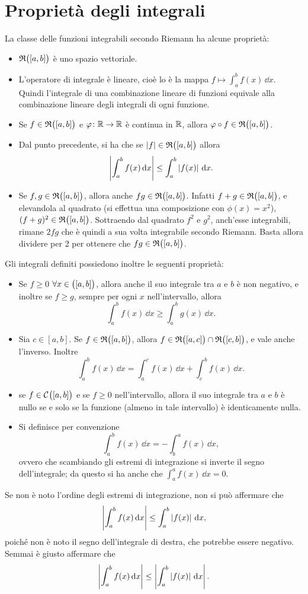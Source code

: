 \section{Proprietà degli integrali}
La classe delle funzioni integrabili secondo Riemann ha alcune proprietà:
\begin{itemize}
\item $\mathfrak{R}\big([a,b]\big)$ è uno spazio vettoriale.
\item L'operatore di integrale è lineare, cioè lo è la mappa $f\mapsto\int_a^bf(x)\,\dd x$. Quindi l'integrale di una combinazione lineare di funzioni equivale alla combinazione lineare degli integrali di ogni funzione.
\item Se $f\in\mathfrak{R}\big([a,b]\big)$ e $\varphi\colon\mathbb{R}\to\mathbb{R}$ è continua in $\mathbb{R}$, allora $\varphi\circ f\in\mathfrak{R}\big([a,b]\big)$.
\item Dal punto precedente, si ha che se $\left|{f}\right|\in\mathfrak{R}\big([a,b]\big)$ allora
\[
\left|{\int_a^bf(x)\,\textup{d} x}\right|\leq\int_a^b\left|{f(x)}\right|\,\textup{d} x.
\]
\item Se $f,g\in\mathfrak{R}\big([a,b]\big)$, allora anche $fg\in\mathfrak{R}\big([a,b]\big)$. Infatti $f+g\in\mathfrak{R}\big([a,b]\big)$, e elevandola al quadrato (si effettua una composizione con $\phi(x)=x^2$), $(f+g)^2\in\mathfrak{R}\big([a,b]\big)$. Sottraendo dal quadrato $f^2$ e $g^2$, anch'esse integrabili, rimane $2fg$ che è quindi a sua volta integrabile secondo Riemann. Basta allora dividere per 2 per ottenere che $fg\in\mathfrak{R}\big([a,b]\big)$.
\end{itemize}
Gli integrali definiti possiedono inoltre le seguenti proprietà:
\begin{itemize}
\item Se $f\geq0$ $\forall x\in\big([a,b]\big)$, allora anche il suo integrale tra $a$ e $b$ è non negativo, e inoltre se $f\geq g$, sempre per ogni $x$ nell'intervallo, allora
\[
\int_a^bf(x)\,\dd x\geq\int_a^bg(x)\,\dd x.
\]
\item Sia $c\in[a,b]$. Se $f\in\mathfrak{R}\big([a,b]\big)$, allora $f\in\mathfrak{R}\big([a,c]\big)\cap\mathfrak{R}\big([c,b]\big)$, e vale anche l'inverso. Inoltre
\[
\int_a^bf(x)\,\dd x=\int_a^cf(x)\,\dd x+\int_c^bf(x)\,\dd x.
\]
\item se $f\in\mathcal{C}^{{}}\big([a,b]\big)$ e se $f\geq 0$ nell'intervallo, allora il suo integrale tra $a$ e $b$ è nullo se e solo se la funzione (almeno in tale intervallo) è identicamente nulla.
\item Si definisce per convenzione
\[
\int_a^bf(x)\,\dd x=-\int_b^af(x)\,\dd x,
\]
ovvero che scambiando gli estremi di integrazione si inverte il segno dell'integrale; da questo si ha anche che $\int_a^af(x)\,\dd x=0$.
\end{itemize}
Se non è noto l'ordine degli estremi di integrazione, non si può affermare che
\[
\left|{\int_a^bf(x)\,\textup{d} x}\right|\leq\int_a^b\left|{f(x)}\right|\,\textup{d} x,
\]
poiché non è noto il segno dell'integrale di destra, che potrebbe essere negativo. Semmai è giusto affermare che
\[
\left|{\int_a^bf(x)\,\textup{d} x}\right|\leq\left|{\int_a^b\left|{f(x)}\right|\,\textup{d} x}\right|.
\]

